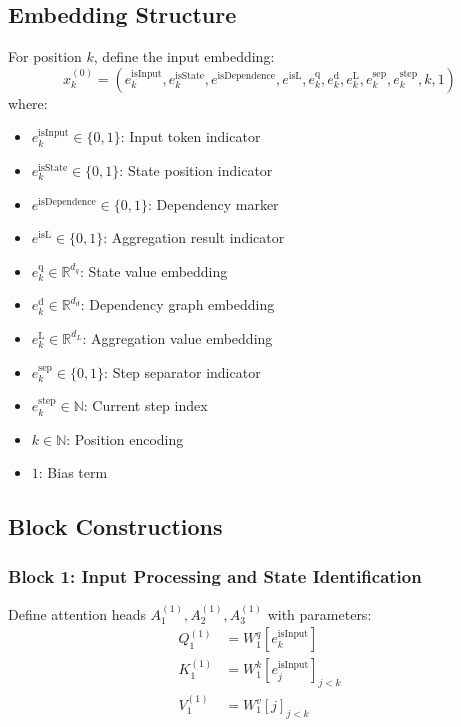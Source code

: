 \subsection{Embedding Structure}
For position $k$, define the input embedding:
\begin{equation*}
    x^{(0)}_k=(e^{\text{isInput}}_k, e^{\text{isState}}_k, e^{\text{isDependence}}, e^{\text{isL}}, e^{\text{q}}_k, e^{\text{d}}_{k}, e^{\text{L}}_k, e^{\text{sep}}_k, e^{\text{step}}_k, k,1)
\end{equation*}
where:
\begin{itemize}
    \item $e^{\text{isInput}}_k \in \{0,1\}$: Input token indicator
    \item $e^{\text{isState}}_k \in \{0,1\}$: State position indicator
    \item $e^{\text{isDependence}} \in \{0,1\}$: Dependency marker
    \item $e^{\text{isL}} \in \{0,1\}$: Aggregation result indicator
    \item $e^{\text{q}}_k \in \mathbb{R}^{d_q}$: State value embedding
    \item $e^{\text{d}}_{k} \in \mathbb{R}^{d_d}$: Dependency graph embedding
    \item $e^{\text{L}}_k \in \mathbb{R}^{d_L}$: Aggregation value embedding
    \item $e^{\text{sep}}_k \in \{0,1\}$: Step separator indicator
    \item $e^{\text{step}}_k \in \mathbb{N}$: Current step index
    \item $k \in \mathbb{N}$: Position encoding
    \item $1$: Bias term
\end{itemize}

\subsection{Block Constructions}

\subsubsection{Block 1: Input Processing and State Identification}
Define attention heads $A^{(1)}_1, A^{(1)}_2, A^{(1)}_3$ with parameters:
\begin{align*}
    Q^{(1)}_1 &= W^q_1[e^{\text{isInput}}_k] \\ 
    K^{(1)}_1 &= W^k_1[e^{\text{isInput}}_j]_{j<k} \\
    V^{(1)}_1 &= W^v_1[j]_{j<k}
\end{align*}

